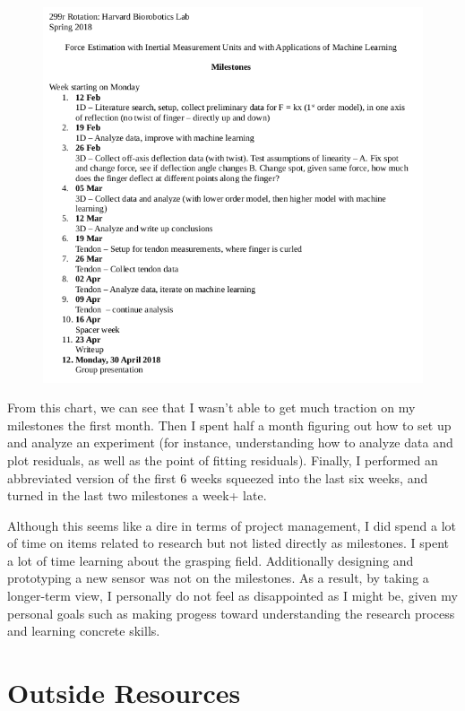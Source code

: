 \documentclass[preprint,12pt,3p]{elsarticle}
\begin{document}
\begin{figure}[H]
\centering
\includegraphics[width=.9\textwidth]{images/misc/timeline.png}
\end{figure}

From this chart, we can see that I wasn't able to get much traction on my
milestones the first month. Then I spent half a month figuring
out how to set up and analyze an experiment (for instance, understanding how to
analyze data and plot residuals, as well as the point of fitting residuals). Finally, I performed an
abbreviated version of the first 6 weeks squeezed into the last six weeks, and
turned in the last two milestones a week+ late.

Although this seems like a dire in terms of project management, I did  spend a
lot of time on items related to research but not listed directly as milestones. 
I spent a lot of time learning about the grasping field. Additionally designing and
prototyping a new sensor was not on the milestones. As a result, by taking a longer-term view, I
personally do not feel as disappointed as I might be, given my personal goals such as making progess
toward understanding the research process and learning concrete skills.

\section{Outside Resources}
\end{document}

